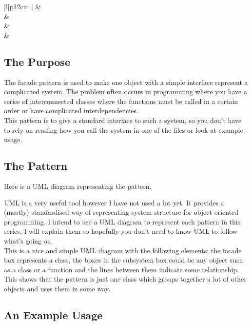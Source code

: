 \documentclass[12pt, oneside]{book} %
\newcommand{\HRule}{\rule{\linewidth}{0.5mm}} %
\newcommand{\tmpsection}[1]{}
\let\tmpsection=\section
\renewcommand{\section}[1]{
  { 
    \samepage{
      \vspace{10 mm} \linespread{0.75} \color{RoyalBlue}{
        \noindent \HRule \tmpsection{#1} \noindent \HRule
      }
    }
  }
}
\newcommand{\patternSummaryGoalMotProCon}[4]{
  \begin{center}
    \begin{tabular}{|l|p{12cm} |}
      \hline
      \color{RoyalBlue}{Goal} & #1
      \\
      \hline
      \color{RoyalBlue}{Motivation} & #2
      \\ 
      \hline
      \color{RoyalBlue}{Pros} & #3
      \\ 
      \hline
      \color{RoyalBlue}{Cons} & #4
      \\ 
      \hline
    \end{tabular}
  \end{center}
}
\begin{document}
\section{Decorator}
\patternSummaryGoalMotProCon{}{}{}{}

\section{Facade}
\subsection{The Purpose}

The facade pattern is used to make one object with a simple interface represent a complicated system. The problem often occurs in programming where you have a series of interconnected classes where the functions must be called in a certain order or have complicated interdependencies.
\\

This pattern is to give a standard interface to such a system, so you don't have to rely on reading how you call the system in one of the files or look at example usage.


\subsection{The Pattern}
Here is a UML diagram representing the pattern.


UML is a very useful tool however I have not used a lot yet. It provides a (mostly) standardised way of representing system structure for object oriented programming. I intend to use a UML diagram to represent each pattern in this series, I will explain them so hopefully you don't need to know UML to follow what's going on. \\

This is a nice and simple UML diagram with the following elements; the facade box represents a class, the boxes in the subsystem box could be any object such as a class or a function and the lines between them indicate some relationship. \\

This shows that the pattern is just one class which groups together a lot of other objects and uses them in some way.

\subsection{An Example Usage}
\end{document}
